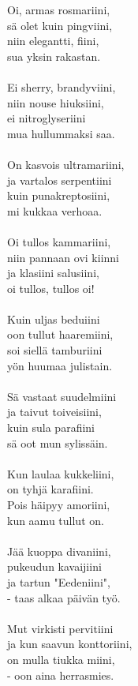 
Oi, armas rosmariini, \\ sä olet kuin pingviini, \\ niin elegantti, fiini, \\ sua yksin rakastan. \\ \hspace{10mm} \\ Ei sherry, brandyviini, \\ niin nouse hiuksiini, \\ ei nitroglyseriini \\ mua hullummaksi saa. \\ \hspace{10mm} \\ On kasvois ultramariini, \\ ja vartalos serpentiini \\ kuin punakreptosiini, \\ mi kukkaa verhoaa. \\ \hspace{10mm} \\ Oi tullos kammariini, \\ niin pannaan ovi kiinni \\ ja klasiini salusiini, \\ oi tullos, tullos oi! \\ \hspace{10mm} \\ Kuin uljas beduiini \\ oon tullut haaremiini, \\ soi siellä tamburiini \\ yön huumaa julistain. \\ \hspace{10mm} \\ Sä vastaat suudelmiini \\ ja taivut toiveisiini, \\ kuin sula parafiini \\ sä oot mun sylissäin. \\ \hspace{10mm} \\ Kun laulaa kukkeliini, \\ on tyhjä karafiini. \\ Pois häipyy amoriini, \\ kun aamu tullut on. \\ \hspace{10mm} \\ Jää kuoppa divaniini, \\ pukeudun kavaijiini \\ ja tartun "Eedeniini", \\ - taas alkaa päivän työ. \\ \hspace{10mm} \\ Mut virkisti pervitiini \\ ja kun saavun konttoriini, \\ on mulla tiukka miini, \\ - oon aina herrasmies.